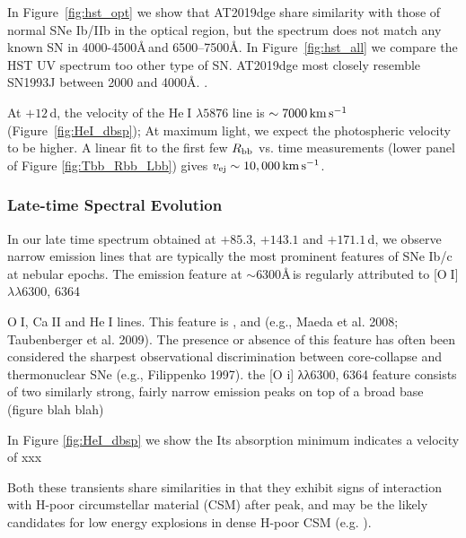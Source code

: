 \documentclass[twocolumn]{aastex63}
\def\ion#1#2{#1$\;${\footnotesize\rm{#2}}\relax}
\begin{document}
\begin{CJK*}{UTF8}{gbsn}
In Figure~\ref{fig:hst_opt} we show that AT2019dge share similarity with those of normal SNe Ib/IIb in 
the optical region, but the spectrum does not match any known SN in 4000-4500\AA\,and 
6500--7500\AA. In Figure~\ref{fig:hst_all} we compare the HST UV spectrum too other type of SN. 
AT2019dge most closely resemble SN1993J between 2000 and 4000\AA. .

At $+12$\,d, the velocity of the \ion{He}{I} $\lambda5876$ line is $\sim7000\, {\rm km\,s^{-1}}$ 
(Figure~\ref{fig:HeI_dbsp}); At maximum light, we expect the photospheric velocity to be higher. A 
linear fit to the first few $R_{\rm bb}$ vs. time measurements (lower panel of Figure 
\ref{fig:Tbb_Rbb_Lbb}) gives $v_{\rm ej}\sim 10,000\, {\rm km\,s^{-1}}$.

\subsubsection{Late-time  Spectral Evolution}
In our late time spectrum obtained at $+85.3$, $+143.1$ and $+171.1$\,d, we observe narrow emission 
lines that are typically the most prominent features of SNe Ib/c at nebular epochs. The emission feature 
at $\sim6300$\AA\,is regularly attributed to [\ion{O}{I}] $\lambda\lambda$6300, 6364 
\citep{Maedo2008}

\ion{O}{I}, \ion{Ca}{II} and \ion{He}{I} lines. 
This feature is , and  (e.g., Maeda et al. 2008; Taubenberger et al. 
2009). The presence or absence of this feature has often been considered the sharpest observational 
discrimination between core-collapse and thermonuclear SNe (e.g., Filippenko 1997). 
the [O i] λλ6300, 6364 feature consists of two similarly strong, fairly narrow emission peaks on top of 
a broad base (figure blah blah)

In Figure \ref{fig:HeI_dbsp} we show the 
Its absorption minimum indicates a velocity of xxx

Both these transients share similarities in that they exhibit signs of interaction with H-poor 
circumstellar material (CSM) after peak, and may be the likely candidates for low energy explosions in 
dense H-poor CSM (e.g. \citealt{KleiserFuller2018, KleiserKasen2018}).


\end{CJK*}
\end{document}
